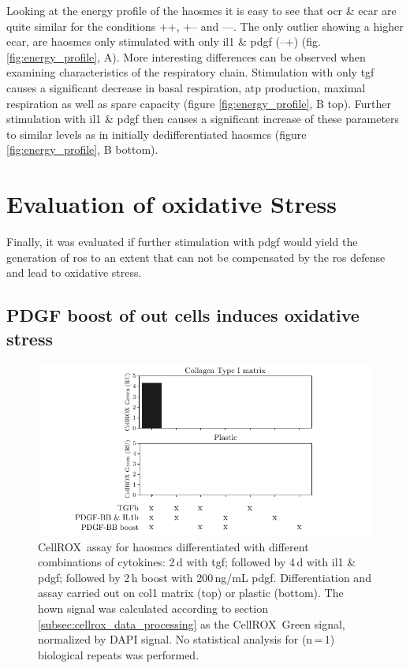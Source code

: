     Looking at the energy profile of the \acp{haosmc} it is easy to see that \ac{ocr} \& \ac{ecar} are quite similar for the conditions ++, +– and ––. The only outlier showing a higher \ac{ecar}, are \acp{haosmc} only stimulated with only \ac{il1} \& \ac{pdgf} (–+) (fig. \ref{fig:energy_profile}, A). More interesting differences can be observed when examining characteristics of the respiratory chain. Stimulation with only \ac{tgf} causes a significant decrease in basal respiration, \ac{atp} production, maximal respiration as well as spare capacity (figure \ref{fig:energy_profile}, B top). Further stimulation with \ac{il1} \& \ac{pdgf} then causes a significant increase of these parameters to similar levels as in initially dedifferentiated \acp{haosmc} (figure \ref{fig:energy_profile}, B bottom).

\section{Evaluation of oxidative Stress}
\label{sec:oxStress}
Finally, it was evaluated if further stimulation with \ac{pdgf} would yield the generation of \ac{ros} to an extent that can not be compensated by the \ac{ros} defense and lead to oxidative stress.

    \subsection{PDGF boost of out cells induces oxidative stress}

    \begin{figure}[h!]
    \capstart
        \centering
    	\includegraphics{Abbildung/CellROX_initial_cond.pdf}

    	\begin{minipage}{\captionwidth}
    		\caption[repeat_Lisa]{ \newline CellROX\texttrademark~assay for \acp{haosmc} differentiated with different combinations of cytokines: 2\,d with \ac{tgf}; followed by 4\,d with \ac{il1} \& \ac{pdgf}; followed by 2\,h boost with 200\,ng/mL \ac{pdgf}. Differentiation and assay carried out on \ac{col1} matrix (top) or plastic (bottom). The hown signal was calculated according to section \ref{subsec:cellrox_data_processing} as the CellROX\texttrademark~Green signal, normalized by DAPI signal. No statistical analysis for (n\,=\,1) biological repeats was performed. }
    		\label{fig:cellrox_8con}
    	\end{minipage}
    \end{figure}

